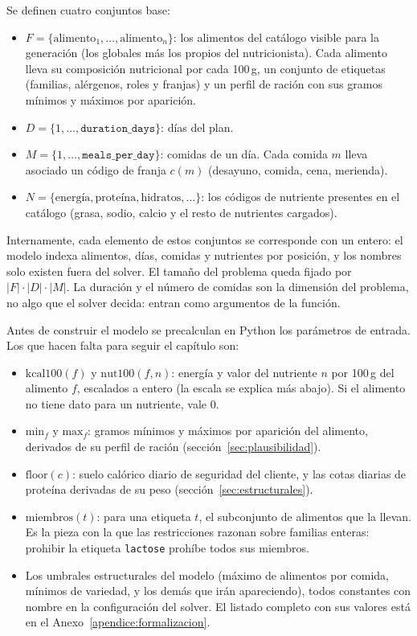 Se definen cuatro conjuntos base:

\begin{itemize}
    \item $F = \{\text{alimento}_1, \dots, \text{alimento}_n\}$: los alimentos del catálogo visible para la generación (los globales más los propios del nutricionista). Cada alimento lleva su composición nutricional por cada 100\,g, un conjunto de etiquetas (familias, alérgenos, roles y franjas) y un perfil de ración con sus gramos mínimos y máximos por aparición.
    \item $D = \{1, \dots, \texttt{duration\_days}\}$: días del plan.
    \item $M = \{1, \dots, \texttt{meals\_per\_day}\}$: comidas de un día. Cada comida $m$ lleva asociado un código de franja $c(m)$ (desayuno, comida, cena, merienda).
    \item $N = \{\text{energía}, \text{proteína}, \text{hidratos}, \dots\}$: los códigos de nutriente presentes en el catálogo (grasa, sodio, calcio y el resto de nutrientes cargados).
\end{itemize}

Internamente, cada elemento de estos conjuntos se corresponde con un entero: el modelo indexa alimentos, días, comidas y nutrientes por posición, y los nombres solo existen fuera del solver. El tamaño del problema queda fijado por $|F| \cdot |D| \cdot |M|$. La duración y el número de comidas son la dimensión del problema, no algo que el solver decida: entran como argumentos de la función.

Antes de construir el modelo se precalculan en Python los parámetros de entrada. Los que hacen falta para seguir el capítulo son:

\begin{itemize}
    \item $\text{kcal100}(f)$ y $\text{nut100}(f, n)$: energía y valor del nutriente $n$ por 100\,g del alimento $f$, escalados a entero (la escala se explica más abajo). Si el alimento no tiene dato para un nutriente, vale 0.
    \item $\text{min}_f$ y $\text{max}_f$: gramos mínimos y máximos por aparición del alimento, derivados de su perfil de ración (sección~\ref{sec:plausibilidad}).
    \item $\text{floor}(c)$: suelo calórico diario de seguridad del cliente, y las cotas diarias de proteína derivadas de su peso (sección~\ref{sec:estructurales}).
    \item $\text{miembros}(t)$: para una etiqueta $t$, el subconjunto de alimentos que la llevan. Es la pieza con la que las restricciones razonan sobre familias enteras: prohibir la etiqueta \texttt{lactose} prohíbe todos sus miembros.
    \item Los umbrales estructurales del modelo (máximo de alimentos por comida, mínimos de variedad, y los demás que irán apareciendo), todos constantes con nombre en la configuración del solver. El listado completo con sus valores está en el Anexo~\ref{apendice:formalizacion}.
\end{itemize}


